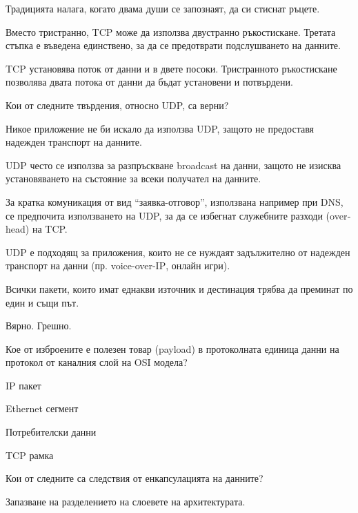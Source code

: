 \begin{questions}
\begin{choices}
    \choice Традицията налага, когато двама души се запознаят, да си стиснат
    ръцете.

    \choice Вместо тристранно, TCP може да използва двустранно
    ръкостискане. Третата стъпка е въведена единствено, за да се предотврати
    подслушването на данните.

    \CorrectChoice TCP установява поток от данни и в двете посоки. Тристранното
    ръкостискане позволява двата потока от данни да бъдат установени и потвърдени.
  \end{choices}

  \question[6] Кои от следните твърдения, относно UDP, са верни?
  \begin{choices}
    \choice Никое приложение не би искало да използва UDP, защото не предоставя
    надежден транспорт на данните.

    \CorrectChoice UDP често се използва за разпръскване
    \foreignlanguage{english}{broadcast} на данни, защото не изисква
    установяването на състояние за всеки получател на данните.

    \CorrectChoice За кратка комуникация от вид "`заявка-отговор"', използвана
    например при DNS, се предпочита използването на UDP, за да се избегнат
    служебните разходи (\foreignlanguage{english}{overhead}) на TCP.

    \CorrectChoice UDP е подходящ за приложения, които не се нуждаят
    задължително от надежден транспорт на данни
    (пр. \foreignlanguage{english}{voice-over-IP}, онлайн игри).
  \end{choices}

  \question[6] Всички пакети, които имат еднакви източник и дестинация трябва да
  преминат по един и същи път.
  \begin{oneparchoices}
    \choice Вярно.
    \CorrectChoice Грешно.
  \end{oneparchoices}

  \question[6] Кое от изброените е полезен товар
  (\foreignlanguage{english}{payload}) в протоколната единица данни на протокол
  от каналния слой на OSI модела?
  \begin{oneparchoices}
    \choice IP пакет

    \CorrectChoice Ethernet сегмент

    \choice Потребителски данни

    \choice TCP рамка
  \end{oneparchoices}

  \question[6] Кои от следните са следствия от енкапсулацията на данните?
  \begin{choices}
    \CorrectChoice Запазване на разделението на слоевете на архитектурата.


\end{choices}
\end{questions}
